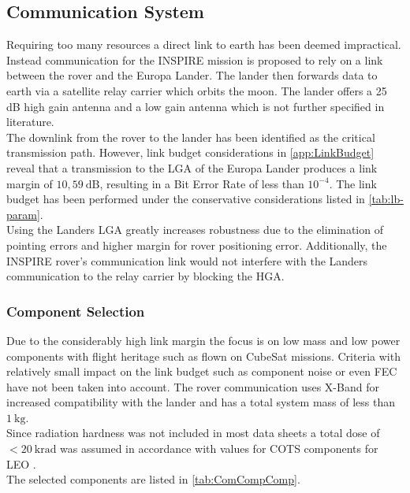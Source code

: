 \subsection{Communication System}
Requiring too many resources a direct link to earth has been deemed impractical. Instead communication for the INSPIRE mission is proposed to rely on a link between the rover and the Europa Lander. The lander then forwards data to earth via a satellite relay carrier which orbits the moon. The lander offers a 25 dB high gain antenna \cite{Lander_HGA} and a low gain antenna which is not further specified in literature.\\

The downlink from the rover to the lander has been identified as the critical transmission path. However, link budget considerations in \autoref{app:LinkBudget} reveal that a transmission to the LGA of the Europa Lander produces a link margin of $10,59~\text{dB}$, resulting in a Bit Error Rate of less than $10^{-4}$. The link budget has been performed under the conservative considerations listed in \autoref{tab:lb-param}.\\

Using the Landers LGA greatly increases robustness due to the elimination of pointing errors and higher margin for rover positioning error. Additionally, the INSPIRE rover’s communication link would not interfere with the Landers communication to the relay carrier by blocking the HGA.

\subsubsection{Component Selection}

Due to the considerably high link margin the focus is on low mass and low power components with flight heritage such as flown on CubeSat missions. Criteria with relatively small impact on the link budget such as component noise or even FEC have not been taken into account. The rover communication uses X-Band for increased compatibility with the lander and has a total system mass of less than $1~\text{kg}$. \\
Since radiation hardness was not included in most data sheets a total dose of $<20~\text{krad}$ was assumed in accordance with values for COTS components for LEO \cite{COTS_Rad}. \\

The selected components are listed in \autoref{tab:ComCompComp}. 

